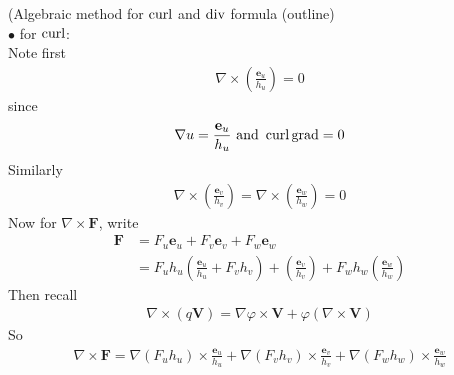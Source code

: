 \documentclass[a4paper]{article}
\begin{document}
\begin{eg} (Algebraic method for $\operatorname{curl}$ and $\operatorname{div}$ formula (outline)\\
$\bullet$ for $\operatorname{curl}$:\\
Note first 
\begin{equation*}
\begin{aligned}
\nabla\times\left(\frac{\mathbf{e}_u}{h_u}\right)=0
\end{aligned}
\end{equation*}
since
\begin{equation*}
\begin{aligned}
\nabla u = \frac{\mathbf{e}_u}{h_u} \text{  and  } \operatorname{curl}\operatorname{grad} = 0
\end{aligned}
\end{equation*}
Similarly
\begin{equation*}
\begin{aligned}
\nabla\times\left(\frac{\mathbf{e}_v}{h_v}\right)=\nabla\times\left(\frac{\mathbf{e}_w}{h_w}\right)=0
\end{aligned}
\end{equation*}
Now for $\nabla\times\mathbf{F}$, write
\begin{equation*}
\begin{aligned}
\mathbf{F} &= F_u \mathbf{e}_u+F_v \mathbf{e}_v+F_w \mathbf{e}_w\\
&=F_u h_u \left(\frac{\mathbf{e}_u}{h_u}+F_v h_v\right) +\left(\frac{\mathbf{e}_v}{h_v}\right)+F_w h_w \left(\frac{\mathbf{e}_w}{h_w}\right)
\end{aligned}
\end{equation*}
Then recall
\begin{equation*}
\begin{aligned}
\nabla\times\left(q\mathbf{V}\right)=\nabla\varphi\times\mathbf{V}+\varphi\left(\nabla\times\mathbf{V}\right)
\end{aligned}
\end{equation*}
So
\begin{equation*}
\begin{aligned}
\nabla\times\mathbf{F}=\nabla\left(F_u h_u\right)\times\frac{\mathbf{e}_u}{h_u}+\nabla\left(F_v h_v\right)\times\frac{\mathbf{e}_v}{h_v}+\nabla\left(F_w h_w\right)\times\frac{\mathbf{e}_w}{h_w}
\end{aligned}
\end{equation*}
\end{eg}
\end{document}
